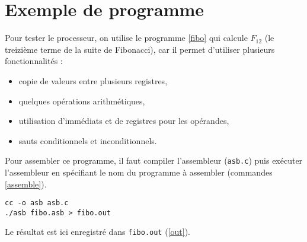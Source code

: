 \section{Exemple de programme}



Pour tester le processeur, on utilise le programme \ref{fibo} qui calcule
$F_{12}$ (le treizième terme de la suite de Fibonacci\cite{fibo}), car il permet
d'utiliser plusieurs fonctionnalités :
\begin{itemize}
\item copie de valeurs entre plusieurs registres,
\item quelques opérations arithmétiques,
\item utilisation d'immédiats et de registres pour les opérandes,
\item sauts conditionnels et inconditionnels. \\
\end{itemize}

Pour assembler ce programme, il faut compiler l'assembleur (\texttt{asb.c}) puis
exécuter l'assembleur en spécifiant le nom du programme à assembler (commandes
\ref{assemble}).

\begin{lstlisting}[caption=Assemblage de \texttt{fibo.asb}, label=assemble]
cc -o asb asb.c
./asb fibo.asb > fibo.out
\end{lstlisting}

Le résultat est ici enregistré dans \texttt{fibo.out} (\ref{out}).


